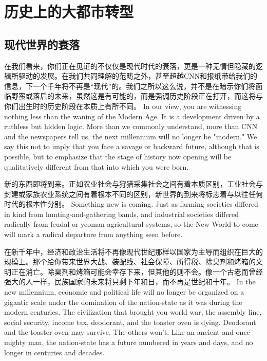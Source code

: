 \chapter[历史上的大都市转型]{历史上的大都市转型}

\section{现代世界的衰落}
\begin{paracol}{2}
在我们看来，你们正在见证的不仅仅是现代时代的衰落，更是一种无情但隐藏的逻辑所驱动的发展。在我们共同理解的范畴之外，甚至超越CNN和报纸带给我们的信息，下一个千年将不再是“现代”的。我们之所以这么说，并不是在暗示你们将面临野蛮或落后的未来，虽然这是有可能的，而是强调历史阶段正在打开，而这将与你们出生时的历史阶段在本质上有所不同。
\switchcolumn
In our view, you are witnessing nothing less than the waning of the Modern Age. It is a development driven by a ruthless but hidden logic. More than we commonly understand, more than CNN and the newspapers tell us, the next millennium will no longer be "modern." We say this not to imply that you face a savage or backward future, although that is possible, but to emphasize that the stage of history now opening will be qualitatively different from that into which you were born.

\switchcolumn*
新的东西即将到来。正如农业社会与狩猎采集社会之间有着本质区别，工业社会与封建或家族农业系统之间有着根本不同的区别，新世界的到来将标志着与以往任何时代的根本性分别。
\switchcolumn
Something new is coming. Just as farming societies differed in kind from hunting-and-gathering bands, and industrial societies differed radically from feudal or yeoman agricultural systems, so the New World to come will mark a radical departure from anything seen before.

\switchcolumn*
在新千年中，经济和政治生活将不再像现代世纪那样以国家为主导而组织在巨大的规模上。那个给你带来世界大战、装配线、社会保障、所得税、除臭剂和烤箱的文明正在消亡。除臭剂和烤箱可能会幸存下来，但其他的则不会。像一个古老而曾经强大的人一样，民族国家的未来将只剩下年和日，而不再是世纪和十年。
\switchcolumn
In the new millennium, economic and political life will no longer be organized on a gigantic scale under the domination of the nation-state as it was during the modern centuries. The civilization that brought you world war, the assembly line, social security, income tax, deodorant, and the toaster oven is dying. Deodorant and the toaster oven may survive. The others won't. Like an ancient and once mighty man, the nation-state has a future numbered in years and days, and no longer in centuries and decades.


\end{paracol}
